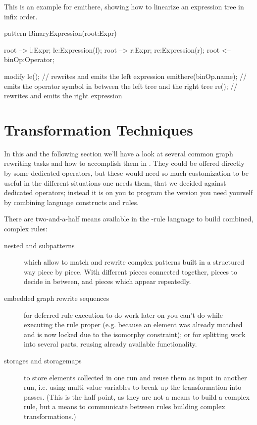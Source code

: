 \begin{example}
	This is an example for emithere, showing how to linearize an expression tree in infix order.
	\begin{grgen}
pattern BinaryExpression(root:Expr)
{
  root --> l:Expr; le:Expression(l);
  root --> r:Expr; re:Expression(r);
  root <-- binOp:Operator;

  modify {
    le(); // rewrites and emits the left expression
    emithere(binOp.name); // emits the operator symbol in between the left tree and the right tree
    re(); // rewrites and emits the right expression
  }
}
	\end{grgen}
\end{example}


\section{Transformation Techniques}\label{sub:mergesplit}

In this and the following section we'll have a look at several common graph rewriting tasks and how to accomplish them in \GrG.
They could be offered directly by some dedicated operators,
but these would need so much customization to be useful in the different situations one needs them,
that we decided against dedicated operators;
instead it is on you to program the version you need yourself by combining language constructs and rules.

There are two-and-a-half means available in the \GrG-rule language to build combined, complex rules:
\begin{description}
	\item[nested and subpatterns]
which allow to match and rewrite complex patterns built in a structured way piece by piece.
With different pieces connected together, pieces to decide in between, and pieces which appear repeatedly.
	\item[embedded graph rewrite sequences]
for deferred rule execution to do work later on you can't do while executing the rule proper (e.g. because an element was already matched and is now locked due to the isomorphy constraint); or for splitting work into several parts, reusing already available functionality.
	\item[storages and storagemaps]
to store elements collected in one run and reuse them as input in another run, i.e. using multi-value variables to break up the transformation into passes. (This is the half point, as they are not a means to build a complex rule, but a means to communicate between rules building complex transformations.)
\end{description}

